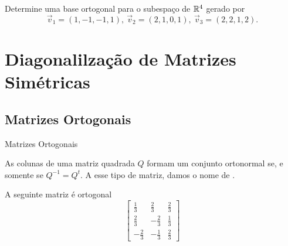 \begin{frame}[label=orto]{}

\begin{casa}
Determine uma base ortogonal para o subespaço de $\mathbb{R}^4$ gerado por
\[\vec{v}_1=(1,-1,-1,1),\ \vec{v}_2=(2,1,0,1),\ \vec{v}_3=(2,2,1,2).\]
\end{casa}
\end{frame}



\section{Diagonalilzação de Matrizes Simétricas}


\subsection*{Matrizes Ortogonais}
\begin{frame}[label=orto]{Matrizes Ortogonais}

As colunas de uma matriz quadrada \(Q\) formam um conjunto {\color{blue}ortonormal} se, e somente se \(Q^{-1}=Q^t\). A esse tipo de matriz, damos o nome de .

\begin{exe}
A seguinte matriz é ortogonal
\[
\begin{bmatrix}
\frac{1}{3} & \frac{2}{3} & \frac{2}{3} \\[0.8em]
\frac{2}{3} & -\frac{2}{3} & \frac{1}{3} \\[0.8em]
-\frac{2}{3} & -\frac{1}{3} & \frac{2}{3}
\end{bmatrix}
\]
\end{exe}






\end{frame}




